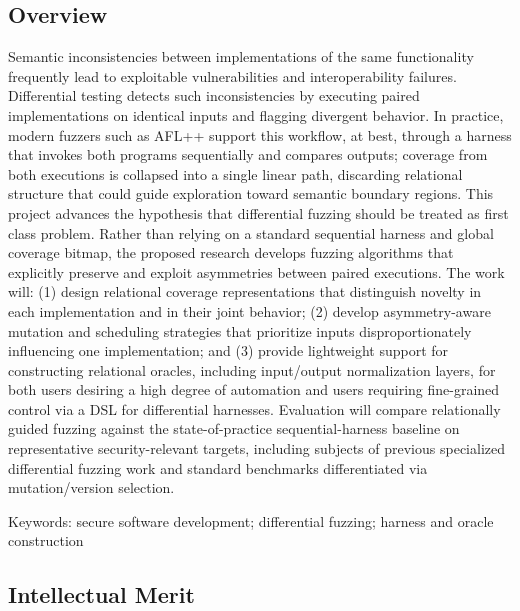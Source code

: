 \documentclass[11pt]{article}
\begin{document}
\begin{center}
{\large\sf\textbf{\proptitle}}
\end{center}

\subsection*{Overview}

Semantic inconsistencies between implementations of the same functionality frequently lead to exploitable vulnerabilities and interoperability failures. Differential testing detects such inconsistencies by executing paired implementations on identical inputs and flagging divergent behavior. In practice, modern fuzzers such as AFL++ support this workflow, at best, through a harness that invokes both programs sequentially and compares outputs; coverage from both executions is collapsed into a single linear path, discarding relational structure that could guide exploration toward semantic boundary regions.
 This project advances the hypothesis that differential fuzzing should be treated as first class problem.  Rather than relying on a standard sequential harness and global coverage bitmap, the proposed research develops fuzzing algorithms that explicitly preserve and exploit asymmetries between paired executions. The work will: (1) design relational coverage representations that distinguish novelty in each implementation and in their joint behavior; (2) develop asymmetry-aware mutation and scheduling strategies that prioritize inputs disproportionately influencing one implementation; and (3) provide lightweight support for constructing relational oracles, including input/output normalization layers, for both users desiring a high degree of automation and users requiring fine-grained control via a DSL for differential harnesses.
Evaluation will compare relationally guided fuzzing against the state-of-practice sequential-harness baseline on representative security-relevant targets, including subjects of previous specialized differential fuzzing work and standard benchmarks differentiated via mutation/version selection. 

Keywords: secure software development; differential fuzzing; harness and oracle construction

\subsection*{Intellectual Merit}
\end{document}
